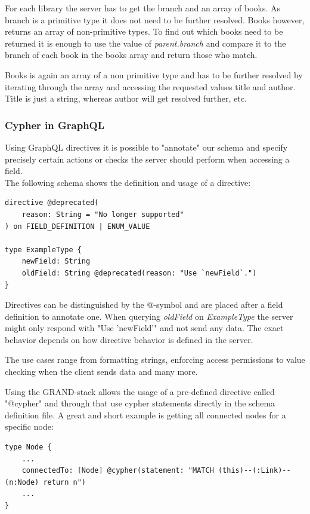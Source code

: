 For each library the server has to get the branch and an array of books. As branch is a primitive type it does not need to be further resolved. Books however, returns an array of non-primitive types. To find out which books need to be returned it is enough to use the value of \emph{parent.branch} and compare it to the branch of each book in the books array and return those who match.

Books is again an array of a non primitive type and has to be further resolved by iterating through the array and accessing the requested values title and author. Title is just a string, whereas author will get resolved further, etc.
\newpage
\subsubsection{Cypher in GraphQL}
Using GraphQL directives it is possible to "annotate" our schema and specify precisely certain actions or checks the server should perform when accessing a field. \\
The following schema shows the definition and usage of a directive: \cite{GraphQlDir}

\lstset{language=GraphQL}
\begin{lstlisting}[caption={Example Directive Declaration}]
directive @deprecated( 
	reason: String = "No longer supported" 
) on FIELD_DEFINITION | ENUM_VALUE 

type ExampleType { 
	newField: String 
	oldField: String @deprecated(reason: "Use `newField`.")
}
\end{lstlisting}

Directives can be distinguished by the @-symbol and are placed after a field definition to annotate one. When querying \emph{oldField} on \emph{ExampleType} the server might only respond with "Use 'newField'" and not send any data. The exact behavior depends on how directive behavior is defined in the server.

The use cases range from formatting strings, enforcing access permissions to value checking when the client sends data and many more. 

Using the GRAND-stack allows the usage of a pre-defined directive called "@cypher" and through that use cypher statements directly in the schema definition file. A great and short example is getting all connected nodes for a specific node:

\begin{lstlisting}[caption={Cypher in GraphQL}]
type Node { 
	... 
	connectedTo: [Node] @cypher(statement: "MATCH (this)--(:Link)--(n:Node) return n") 
	...
}
\end{lstlisting}

